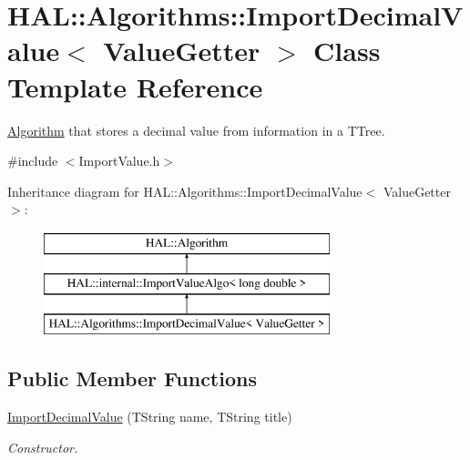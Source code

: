\hypertarget{class_h_a_l_1_1_algorithms_1_1_import_decimal_value}{\section{H\+A\+L\+:\+:Algorithms\+:\+:Import\+Decimal\+Value$<$ Value\+Getter $>$ Class Template Reference}
\label{class_h_a_l_1_1_algorithms_1_1_import_decimal_value}
}


\hyperlink{class_h_a_l_1_1_algorithm}{Algorithm} that stores a decimal value from information in a T\+Tree.  




{\ttfamily \#include $<$Import\+Value.\+h$>$}

Inheritance diagram for H\+A\+L\+:\+:Algorithms\+:\+:Import\+Decimal\+Value$<$ Value\+Getter $>$\+:\begin{figure}[H]
\begin{center}
\leavevmode
\includegraphics[height=3.000000cm]{class_h_a_l_1_1_algorithms_1_1_import_decimal_value}
\end{center}
\end{figure}
\subsection*{Public Member Functions}
\begin{DoxyCompactItemize}
\item 
\hyperlink{class_h_a_l_1_1_algorithms_1_1_import_decimal_value_aa1f2c9f13b324cbef3d8632b64e21419}{Import\+Decimal\+Value} (T\+String name, T\+String title)
\begin{DoxyCompactList}\small\item\em Constructor. \end{DoxyCompactList}\end{DoxyCompactItemize}
